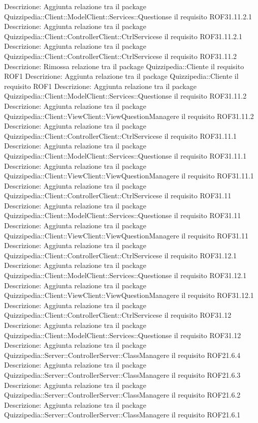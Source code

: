 Descrizione: Aggiunta relazione tra il package Quizzipedia::Client::ModelClient::Services::Questionse il requisito ROF31.11.2.1 
Descrizione: Aggiunta relazione tra il package Quizzipedia::Client::ControllerClient::CtrlServicese il requisito ROF31.11.2.1 
Descrizione: Aggiunta relazione tra il package Quizzipedia::Client::ControllerClient::CtrlServicese il requisito ROF31.11.2 
Descrizione: Rimossa relazione tra il package Quizzipedia::Cliente il requisito ROF1 
Descrizione: Aggiunta relazione tra il package Quizzipedia::Cliente il requisito ROF1 
Descrizione: Aggiunta relazione tra il package Quizzipedia::Client::ModelClient::Services::Questionse il requisito ROF31.11.2 
Descrizione: Aggiunta relazione tra il package Quizzipedia::Client::ViewClient::ViewQuestionManagere il requisito ROF31.11.2 
Descrizione: Aggiunta relazione tra il package Quizzipedia::Client::ControllerClient::CtrlServicese il requisito ROF31.11.1 
Descrizione: Aggiunta relazione tra il package Quizzipedia::Client::ModelClient::Services::Questionse il requisito ROF31.11.1 
Descrizione: Aggiunta relazione tra il package Quizzipedia::Client::ViewClient::ViewQuestionManagere il requisito ROF31.11.1 
Descrizione: Aggiunta relazione tra il package Quizzipedia::Client::ControllerClient::CtrlServicese il requisito ROF31.11 
Descrizione: Aggiunta relazione tra il package Quizzipedia::Client::ModelClient::Services::Questionse il requisito ROF31.11 
Descrizione: Aggiunta relazione tra il package Quizzipedia::Client::ViewClient::ViewQuestionManagere il requisito ROF31.11 
Descrizione: Aggiunta relazione tra il package Quizzipedia::Client::ControllerClient::CtrlServicese il requisito ROF31.12.1 
Descrizione: Aggiunta relazione tra il package Quizzipedia::Client::ModelClient::Services::Questionse il requisito ROF31.12.1 
Descrizione: Aggiunta relazione tra il package Quizzipedia::Client::ViewClient::ViewQuestionManagere il requisito ROF31.12.1 
Descrizione: Aggiunta relazione tra il package Quizzipedia::Client::ControllerClient::CtrlServicese il requisito ROF31.12 
Descrizione: Aggiunta relazione tra il package Quizzipedia::Client::ModelClient::Services::Questionse il requisito ROF31.12 
Descrizione: Aggiunta relazione tra il package Quizzipedia::Server::ControllerServer::ClassManagere il requisito ROF21.6.4 
Descrizione: Aggiunta relazione tra il package Quizzipedia::Server::ControllerServer::ClassManagere il requisito ROF21.6.3 
Descrizione: Aggiunta relazione tra il package Quizzipedia::Server::ControllerServer::ClassManagere il requisito ROF21.6.2 
Descrizione: Aggiunta relazione tra il package Quizzipedia::Server::ControllerServer::ClassManagere il requisito ROF21.6.1 

